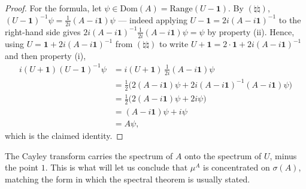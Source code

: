 \begin{proof}
For the formula, let $\psi \in \text{Dom}(A) = \text{Range}(U - \mathbf{1})$. By $(\natural\natural)$, $(U-\mathbf{1})^{-1}\psi = \tfrac{1}{2i}(A-i\mathbf{1})\psi$ — indeed applying $U - \mathbf{1} = 2i(A-i\mathbf{1})^{-1}$ to the right-hand side gives $2i(A-i\mathbf{1})^{-1}\tfrac{1}{2i}(A-i\mathbf{1})\psi = \psi$ by property (ii). Hence, using $U = \mathbf{1} + 2i(A-i\mathbf{1})^{-1}$ from $(\natural\natural)$ to write $U + \mathbf{1} = 2\cdot\mathbf{1} + 2i(A-i\mathbf{1})^{-1}$ and then property (i),
\begin{align}
    i(U+\mathbf{1})(U-\mathbf{1})^{-1}\psi
        &= i(U+\mathbf{1})\,\frac{1}{2i}(A-i\mathbf{1})\psi \\
        &= \frac{1}{2}\Big( 2(A - i\mathbf{1})\psi + 2i(A-i\mathbf{1})^{-1}(A-i\mathbf{1})\psi \Big) \\
        &= \frac{1}{2}\Big( 2(A-i\mathbf{1})\psi + 2i\psi \Big) \\
        &= (A - i\mathbf{1})\psi + i\psi \\
        &= A\psi,
\end{align}
which is the claimed identity.
\end{proof}

The Cayley transform carries the spectrum of $A$ onto the spectrum of $U$, minus the point $1$. This is what will let us conclude that $\mu^A$ is concentrated on $\sigma(A)$, matching the form in which the spectral theorem is usually stated.

